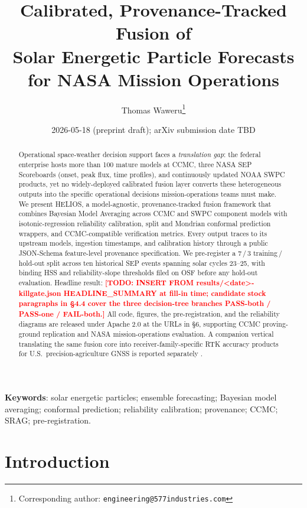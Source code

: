 \documentclass[11pt,letterpaper]{article}
\title{
  Calibrated, Provenance-Tracked Fusion of \\
  Solar Energetic Particle Forecasts \\
  for NASA Mission Operations
}
\author[1]{Thomas Waweru\thanks{Corresponding author: \texttt{engineering@577industries.com}}}
\author[1]{\todo{Named Senior ML Engineer}}
\author[2]{\todo{Named Space-Weather / Ionospheric SME}}
\affil[1]{577 Industries Inc., Columbus, OH, USA}
\affil[2]{Subcontract; institutional affiliation TBD at submission}
\date{2026-05-18 (preprint draft); arXiv submission date TBD}
\newcommand{\todo}[1]{\textcolor{red}{\textbf{[TODO: #1]}}}
\begin{document}
\maketitle

\begin{abstract}
\noindent
Operational space-weather decision support faces a \emph{translation gap}: the
federal enterprise hosts more than 100 mature models at CCMC, three NASA
SEP Scoreboards (onset, peak flux, time profiles), and continuously updated
NOAA SWPC products, yet no widely-deployed calibrated fusion layer converts
these heterogeneous outputs into the specific operational decisions
mission-operations teams must make.  We present HELIOS, a model-agnostic,
provenance-tracked fusion framework that combines Bayesian Model Averaging
across CCMC and SWPC component models with isotonic-regression reliability
calibration, split and Mondrian conformal prediction wrappers, and CCMC-compatible
verification metrics.  Every output traces to its upstream models, ingestion
timestamps, and calibration history through a public JSON-Schema feature-level
provenance specification.  We pre-register a 7\,/\,3 training\,/\,hold-out
split across ten historical SEP events spanning solar cycles 23--25, with
binding HSS and reliability-slope thresholds filed on OSF before any hold-out
evaluation.  Headline result: \todo{INSERT FROM
results/<date>-killgate.json HEADLINE\_SUMMARY at fill-in time;
candidate stock paragraphs in §4.4 cover the three decision-tree branches
PASS-both / PASS-one / FAIL-both.}  All code, figures, the
pre-registration, and the reliability diagrams are released under Apache 2.0
at the URLs in §6, supporting CCMC proving-ground replication and
NASA mission-operations evaluation.  A companion vertical translating the
same fusion core into receiver-family-specific RTK accuracy products for
U.S.\ precision-agriculture GNSS is reported separately
\cite{gannon_rtk}.
\end{abstract}

\bigskip
\noindent\textbf{Keywords}: solar energetic particles; ensemble forecasting;
Bayesian model averaging; conformal prediction; reliability calibration;
provenance; CCMC; SRAG; pre-registration.

\section{Introduction}
\label{sec:intro}
\end{document}
